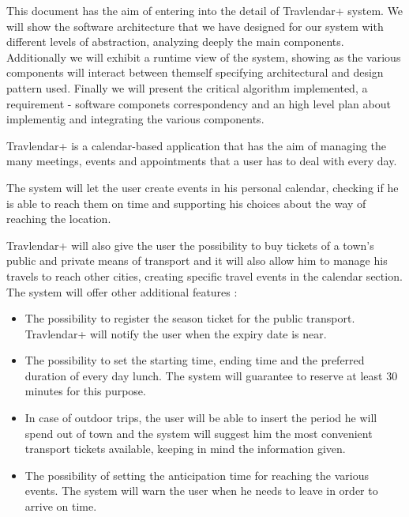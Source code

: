 \vspace*{-5mm}

This document has the aim of entering into the detail of Travlendar+ system. 
We will show the software architecture that we have designed for our system with different levels of abstraction, analyzing deeply the main components. 
Additionally we will exhibit a runtime view of the system, showing as the various components will interact between themself specifying architectural and design pattern used.
Finally we will present the critical algorithm implemented, a requirement - software componets correspondency and an high level plan about implementig and integrating the various components.

Travlendar+ is a calendar-based application that has the aim of managing the many meetings, events and appointments that a user has to deal with every day.\par
The system will let the user create events in his personal calendar, checking if he is able to reach them on time and supporting his choices about the way of reaching the location. \par
Travlendar+ will also give the user the possibility to buy tickets of a town’s public and private means of transport and it will also allow him to manage his travels to reach other cities, creating specific travel events in the calendar section.
The system will offer other additional features :
\begin{itemize}
	\setlength{\leftskip}{0.5cm}
	\item The possibility to register the season ticket for the public transport. Travlendar+ will notify the user when the expiry date is near.
	\item The possibility to set the starting time, ending time and the preferred duration of every day lunch. The system will guarantee to reserve at least 30 minutes for this purpose.
	\item In case of outdoor trips, the user will be able to insert the period he will spend out of town and the system will suggest him the most convenient transport tickets available, keeping in mind the information given.
	\item The possibility of setting the anticipation time for reaching the various events. The system will warn the user when he needs to leave in order to arrive on time.
\end{itemize}

